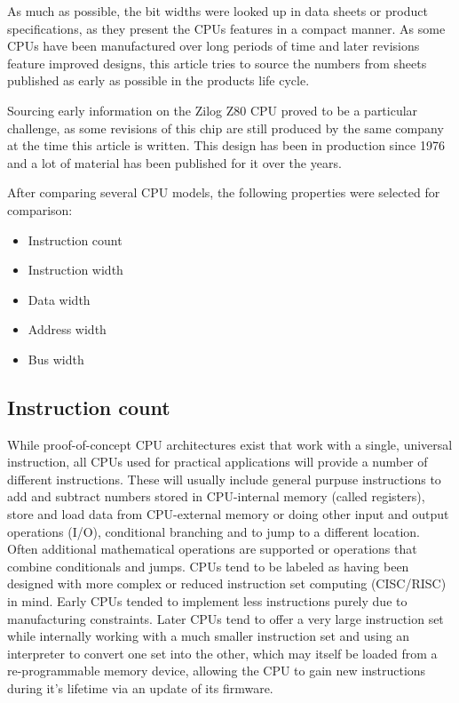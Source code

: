 \documentclass[twoside,twocolumn]{article}
\begin{document}
As much as possible, the bit widths were looked up in data sheets or product
specifications, as they present the CPUs features in a compact manner. As some CPUs have
been manufactured over long periods of time and later revisions feature improved designs,
this article tries to source the numbers from sheets published as early as possible in
the products life cycle.

Sourcing early information on the Zilog Z80 CPU proved to be a particular challenge, as
some revisions of this chip are still produced by the same company at the time this
article is written. This design has been in production since 1976 and a lot of material
has been published for it over the years.

After comparing several CPU models, the following properties were selected for comparison:

\begin{itemize}
\item Instruction count
\item Instruction width
\item Data width
\item Address width
\item Bus width
\end{itemize}

\subsection{Instruction count}

While proof-of-concept CPU architectures exist that work with a single, universal
instruction, all CPUs used for practical applications will provide a number of different
instructions. These will usually include general purpuse instructions to add and
subtract numbers stored in CPU-internal memory (called registers), store and load data
from CPU-external memory or doing other input and output operations (I/O), conditional
branching and to jump to a different location. Often additional mathematical operations
are supported or operations that combine conditionals and jumps. CPUs tend to be labeled
as having been designed with more complex or reduced instruction set computing
(CISC/RISC) in mind. Early CPUs tended to implement less instructions purely due to
manufacturing constraints. Later CPUs tend to offer a very large instruction set while
internally working with a much smaller instruction set and using an interpreter to
convert one set into the other, which may itself be loaded from a re-programmable memory
device, allowing the CPU to gain new instructions during it's lifetime via an update of
its firmware.
\end{document}
